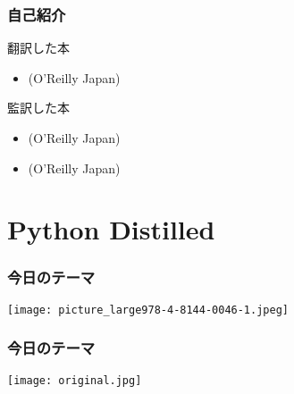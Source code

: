\documentclass[aspectratio=169,dvipdfmx,12pt,notheorems]{beamer}
\theoremstyle{definition}
\begin{document}
\begin{frame}\frametitle{自己紹介}

\begin{block}{翻訳した本}
\begin{itemize}
\item {}(O'Reilly Japan)  
\end{itemize}
\end{block}

\begin{block}{監訳した本}
\begin{itemize}
\item {}(O'Reilly Japan) 
\item {}(O'Reilly Japan) 
\end{itemize}
\end{block}

\end{frame}

\section{Python Distilled}

\begin{frame}\frametitle{今日のテーマ}

\begin{center}
\texttt{[image: picture\_large978-4-8144-0046-1.jpeg]}
\end{center}

\end{frame}

\begin{frame}\frametitle{今日のテーマ}

\begin{center}
\texttt{[image: original.jpg]}
\end{center}

\end{frame}
\end{document}
